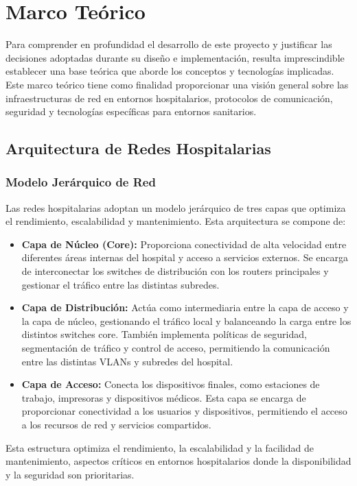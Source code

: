 
\chapter{Marco Teórico}\label{MarcoTeórico}
Para comprender en profundidad el desarrollo de este proyecto y justificar las decisiones adoptadas durante su diseño e implementación, resulta imprescindible establecer 
una base teórica que aborde los conceptos y tecnologías implicadas. Este marco teórico tiene como finalidad proporcionar una visión general sobre las 
infraestructuras de red en entornos hospitalarios, protocolos de comunicación, seguridad y tecnologías específicas para entornos sanitarios.

\section{Arquitectura de Redes Hospitalarias}

\subsection{Modelo Jerárquico de Red}
Las redes hospitalarias adoptan un modelo jerárquico de tres capas que optimiza el rendimiento, escalabilidad y mantenimiento. Esta arquitectura se compone de:
\begin{itemize}
    \item \textbf{Capa de Núcleo (Core):} Proporciona conectividad de alta velocidad entre diferentes áreas internas del hospital y acceso a servicios externos. Se encarga de 
    interconectar los switches de distribución con los routers principales y gestionar el tráfico entre las distintas subredes.
    \item \textbf{Capa de Distribución:} Actúa como intermediaria entre la capa de acceso y la capa de núcleo, gestionando el tráfico local y balanceando la carga
    entre los distintos switches core. También implementa políticas de seguridad, segmentación de tráfico y control de acceso, permitiendo la comunicación entre las distintas 
    \acs{VLAN}s y subredes del hospital.
    \item \textbf{Capa de Acceso:} Conecta los dispositivos finales, como estaciones de trabajo, impresoras y dispositivos médicos. Esta capa se encarga de proporcionar
    conectividad a los usuarios y dispositivos, permitiendo el acceso a los recursos de red y servicios compartidos. 
\end{itemize}
Esta estructura optimiza el rendimiento, la escalabilidad y la facilidad de mantenimiento, aspectos críticos en entornos hospitalarios donde la disponibilidad y la seguridad son prioritarias.

